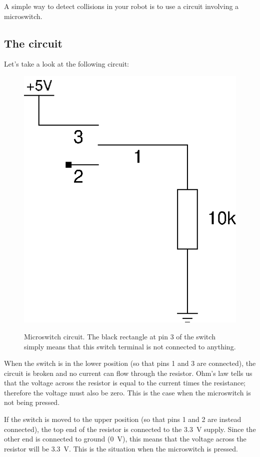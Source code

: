 \documentclass{article}
\begin{document}
A simple way to detect collisions in your robot is to use a circuit involving a
microswitch. 

\subsection{The circuit}

Let's take a look at the following circuit:

\begin{figure}[h]
\centering
\includegraphics[scale=.7]{assets/fig/schem/switch}
\label{fig:schem:switch}
\caption{Microswitch circuit. The black rectangle at pin 3 of the switch simply
means that this switch terminal is not connected to anything.}
\end{figure}

When the switch is in the lower position (so that pins 1 and 3 are connected),
the circuit is broken and no current can flow through the resistor. Ohm's law
tells us that the voltage across the resistor is equal to the current times the
resistance; therefore the voltage must also be zero. This is the case when the
microswitch is not being pressed.

If the switch is moved to the upper position (so that pins 1 and 2 are instead
connected), the top end of the resistor is connected to the \SI{3.3}{\volt}
supply. Since the other end is connected to ground (\SI{0}{\volt}), this means
that the voltage across the resistor will be \SI{3.3}{\volt}. This is the
situation when the microswitch is pressed.
\end{document}
